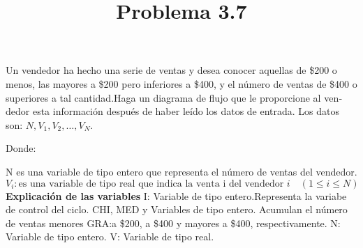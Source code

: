 \documentclass[11pt]{amsart}
\title{Problema 3.7}
\begin{document}
\maketitle
\noindent  Un vendedor ha hecho una serie de ventas y desea conocer aquellas de \$200 o menos, las mayores a \$200 pero inferiores a \$400, y el número de ventas de \$400 o superiores a tal cantidad.Haga un diagrama de flujo que le proporcione al ven­dedor esta información después de haber leído los datos de entrada.  \newline
Los datos son: $N, V_1, V_2, \ldots, V_N$.   \newline

 \noindent  Donde:  \newline
 
N es una variable de tipo entero que representa el número de ventas del vendedor.
\[
\text{$V_i$}: \text{{es una variable de tipo real que indica la venta i del vendedor }} i \quad (1 \leq i \leq N)
\]
\noindent  \textbf{Explicación de las variables} \newline
I: Variable de tipo entero.Representa la variabe de control del ciclo. \newline
CHI, MED y Variables de tipo entero. Acumulan el número de ventas menores\newline
GRA:a \$200, a \$400 y mayores a \$400, respectivamente.\newline
N: Variable de tipo entero. \newline
V: Variable de tipo real. \newline
\end{document}
